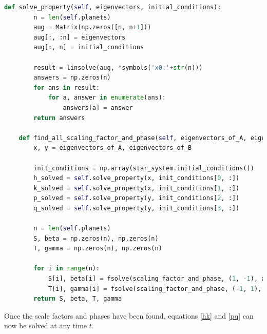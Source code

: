 \documentclass[11pt, oneside]{article}   	%
\begin{document}
\begin{lstlisting}[language=Python, caption={Calculating the scale factors and phases}, firstnumber=73, label=s_phase]
    def solve_property(self, eigenvectors, initial_conditions):
        n = len(self.planets)
        aug = Matrix(np.zeros([n, n+1]))
        aug[:, :n] = eigenvectors
        aug[:, n] = initial_conditions

        result = linsolve(aug, *symbols('x0:'+str(n)))
        answers = np.zeros(n)
        for ans in result:
            for a, answer in enumerate(ans):
                answers[a] = answer
        return answers

    def find_all_scaling_factor_and_phase(self, eigenvectors_of_A, eigenvectors_of_B):
        x, y = eigenvectors_of_A, eigenvectors_of_B

        init_conditions = np.array(star_system.initial_conditions())
        h_solved = self.solve_property(x, init_conditions[0, :])
        k_solved = self.solve_property(x, init_conditions[1, :])
        p_solved = self.solve_property(y, init_conditions[2, :])
        q_solved = self.solve_property(y, init_conditions[3, :])

        n = len(self.planets)
        S, beta = np.zeros(n), np.zeros(n)
        T, gamma = np.zeros(n), np.zeros(n)

        for i in range(n):
            S[i], beta[i] = fsolve(scaling_factor_and_phase, (1, -1), args=(h_solved[i], k_solved[i],))
            T[i], gamma[i] = fsolve(scaling_factor_and_phase, (-1, 1), args=(p_solved[i], q_solved[i],))
        return S, beta, T, gamma
\end{lstlisting}

Once the scale factors and phases have been found, equations \ref{hk} and \ref{pq} can now be solved at any time $t$.
\end{document}
